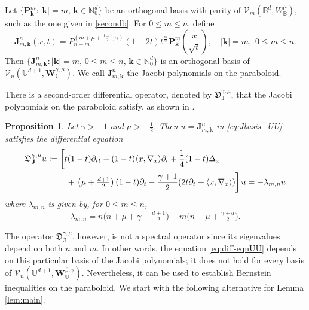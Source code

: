 \documentclass{amsart}
\newtheorem{prop}[thm]{Proposition}
\theoremstyle{remark}
\def\la{{\langle}}
\def\ra{{\rangle}}
\def\sQ{{\mathsf Q}}
\def\fD{{\mathfrak D}}
\def\b{{\beta}}
\def\g{{\gamma}}
\def\l{{\lambda}}
\def\la{{\langle}}
\def\ra{{\rangle}}
\def\hb{{\mathbf h}}
\def\kb{{\mathbf k}}
\def\Jb{{\mathbf J}}
\def\Pb{{\mathbf P}}
\def\Qb{{\mathbf Q}}
\def\Wb{{\mathbf W}}
\def\CV{{\mathcal V}}
\def\BB{{\mathbb B}}
\def\NN{{\mathbb N}}
\def\UU{{\mathbb U}}
\def\f{\frac}
\begin{document}
Let $\{\Pb_{\kb}^m: |\kb| = m, \, \kb\in \NN_0^d\}$ be an orthogonal basis with parity of $\CV_m(\BB^d,W_\BB^\mu)$,
such as the one given in \eqref{secondb}. For $0 \le m \le n$, define  
\begin{equation} \label{eq:Jbasis_UU}
 \Jb_{m,\kb}^n(x,t) = P_{n-m}^{(m+\mu+\f{d-1}{2},\g)}(1-2 t) t^{\f{m}{2}} 
    \Pb_{\kb}^m \left(\frac{x}{\sqrt{t} }\right), \quad |\kb| = m, \,\, 0\le m \le n.
\end{equation}
Then $\{\Jb_{m,\kb}^n: |\kb | = m, \, 0 \le m  \le n, \, \kb \in \NN_0^d\}$ is an orthogonal basis of 
$\CV_n(\UU^{d+1}, \Wb_\UU^{\g,\mu})$. 
We call $\Jb_{m,\kb}^n$ the Jacobi polynomials on the paraboloid. 
 
There is a second-order differential operator, denoted by $\fD_{\Jb}^{\g,\mu}$, that the Jacobi polynomials 
on the paraboloid satisfy, as shown in \cite{X23a}. 

\begin{prop}
Let $\g > -1$ and $\mu > -\f12$. Then $u= \Jb_{m,\kb}^n$ in \eqref{eq:Jbasis_UU} satisfies the differential 
equation 
\begin{align}\label{eq:diff-eqnUU}
 & \fD_{\Jb}^{\g,\mu} u : = \left[ t (1-t) \partial_{tt} + (1-t) \la x,\nabla_x\ra \partial_t + \frac{1}{4} (1-t)\Delta_x  \right. \\
      & \qquad   \qquad  \quad
      +\left.   \left(\mu+\tfrac{d+1}{2}\right)(1-t)\partial_t   - \frac{\g+1}{2} (2t \partial_t +  \la x,\nabla_x\ra) \right]  u 
       = - \l_{m,n} u \notag
\end{align}
where $\lambda_{m,n}$ is given by, for $0 \le m \le n$, 
$$
 \l_{m,n} = n \big( n+\mu+ \g + \tfrac{d+1}{2}\big) - m \big(n + \mu+\tfrac{\g + d}{2}\big). 
$$
\end{prop}

The operator $\fD_{\Jb}^{\g,\mu}$, however, is not a spectral operator since its eigenvalues depend on both 
$n$ and $m$. In other words, the equation \eqref{eq:diff-eqnUU} depends on this particular basis of the Jacobi 
polynomials; it does not hold for every basis of $\CV_n(\UU^{d+1}, \Wb_{\UU}^{\b,\g})$. Nevertheless, it can
be used to establish Bernstein inequalities on the paraboloid. We start with the following alternative for
Lemma \ref{lem:main}. 
\end{document}
